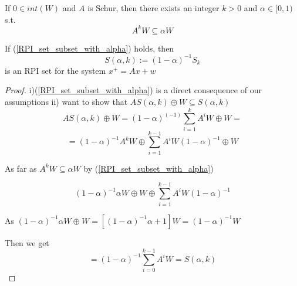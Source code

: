 \begin{Theorem}

If $0 \in int(W)$ and $A$ is Schur, then there exists an integer $k > 0$ and $\alpha \in [0,1)$ s.t.
\begin{equation}\label{RPI_set_subset_with_alpha}
A^kW \subseteq \alpha W
\end{equation} 

If (\ref{RPI_set_subset_with_alpha}) holds, then 
\begin{equation*}
S(\alpha,k) := (1-\alpha)^{-1}S_k
\end{equation*}
is an RPI set for the system $x^+ = Ax + w$

\begin{proof}

i)(\ref{RPI_set_subset_with_alpha}) is a direct consequence of our assumptions
ii) want to show that $AS(\alpha,k) \oplus W \subseteq S(\alpha,k)$
\begin{equation*}
AS(\alpha,k) \oplus W = (1-\alpha)^(-1) \sum_{i=1}^{k} A^iW \oplus W= 
\end{equation*}
\begin{equation*}
= (1 - \alpha)^{-1} A^kW \oplus \sum_{i=1}^{k-1}A^iW(1-\alpha)^{-1} \oplus W
\end{equation*}

As far as $A^kW \subseteq \alpha W$ by (\ref{RPI_set_subset_with_alpha})

\begin{equation*}
(1-\alpha)^{-1}\alpha W \oplus W \oplus \sum_{i=1}^{k-1}A^iW(1-\alpha)^{-1}
\end{equation*}

As $(1-\alpha)^{-1}\alpha W \oplus W = [(1-\alpha)^{-1} \alpha + 1]W = (1-\alpha)^{-1}W$

Then we get 
\begin{equation*}
= (1-\alpha)^{-1}\sum_{i=0}^{k-1}A^iW = S(\alpha,k)
\end{equation*}
\end{proof}
\end{Theorem}

